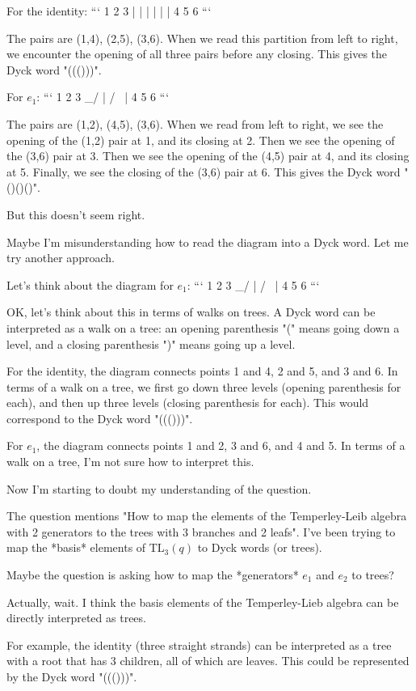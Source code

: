 \documentclass[12p]{article}
\newcounter{reasoningcounter}
\newenvironment{reasoning}[1][]
{\refstepcounter{reasoningcounter}%
\begin{tcolorbox}[
    title=Reasoning \thereasoningcounter: #1,
    colback=white, %
    colframe=gray,
    coltext=black, %
    fonttitle=\bfseries\normalsize,
    top=2mm,
    bottom=2mm,
    enlarge top initially by=5mm
]
\small
}
{\end{tcolorbox}}
\begin{document}
\begin{reasoning}
For the identity:
```
1 2 3
| | |
| | |
4 5 6
```

The pairs are (1,4), (2,5), (3,6). When we read this partition from left to right, we encounter the opening of all three pairs before any closing. This gives the Dyck word "((()))".

For $e_1$:
```
1   2   3
 \_/    |
 / \    |
4   5   6
```

The pairs are (1,2), (4,5), (3,6). When we read from left to right, we see the opening of the (1,2) pair at 1, and its closing at 2. Then we see the opening of the (3,6) pair at 3. Then we see the opening of the (4,5) pair at 4, and its closing at 5. Finally, we see the closing of the (3,6) pair at 6. This gives the Dyck word "()()()".

But this doesn't seem right.

Maybe I'm misunderstanding how to read the diagram into a Dyck word. Let me try another approach.

Let's think about the diagram for $e_1$:
```
1   2   3
 \_/    |
 / \    |
4   5   6
```

OK, let's think about this in terms of walks on trees. A Dyck word can be interpreted as a walk on a tree: an opening parenthesis "(" means going down a level, and a closing parenthesis ")" means going up a level.

For the identity, the diagram connects points 1 and 4, 2 and 5, and 3 and 6. In terms of a walk on a tree, we first go down three levels (opening parenthesis for each), and then up three levels (closing parenthesis for each). This would correspond to the Dyck word "((()))".

For $e_1$, the diagram connects points 1 and 2, 3 and 6, and 4 and 5. In terms of a walk on a tree, I'm not sure how to interpret this. 

Now I'm starting to doubt my understanding of the question. 

The question mentions "How to map the elements of the Temperley-Leib algebra with 2 generators to the trees with 3 branches and 2 leafs". I've been trying to map the *basis* elements of $\text{TL}_3(q)$ to Dyck words (or trees).

Maybe the question is asking how to map the *generators* $e_1$ and $e_2$ to trees?

Actually, wait. I think the basis elements of the Temperley-Lieb algebra can be directly interpreted as trees.

For example, the identity (three straight strands) can be interpreted as a tree with a root that has 3 children, all of which are leaves. This could be represented by the Dyck word "((()))".


\end{reasoning}
\end{document}
